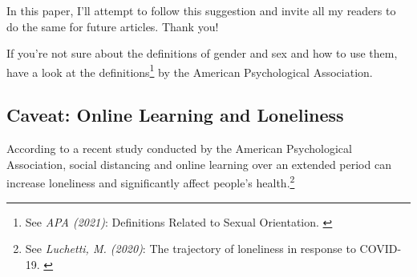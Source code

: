 In this paper, I'll attempt to follow this suggestion and invite all my readers to do the same for future articles. Thank you!

If you're not sure about the definitions of gender and sex and how to use them, have a look at the definitions\footnote{See \textit{APA (2021)}: Definitions Related to Sexual Orientation. \cite{apaDefinitions}} by the American Psychological Association.

\subsection{Caveat: Online Learning and Loneliness}

According to a recent study conducted by the American Psychological Association, social distancing and online learning over an extended period can increase loneliness and significantly affect people's health.\footnote{See \textit{Luchetti, M. (2020)}: The trajectory of loneliness in response to COVID-19. \cite{apaLoneliness}}
